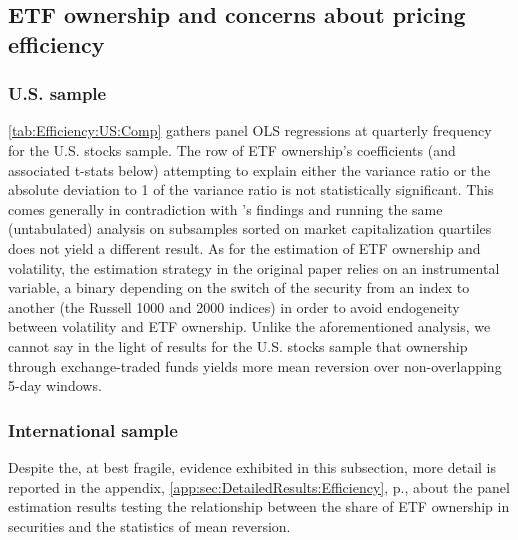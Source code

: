 \subsection{ETF ownership and concerns about pricing efficiency}
\label{sec:Results:sub:Efficiency}
\subsubsection{U.S. sample}
\autoref{tab:Efficiency:US:Comp} gathers panel OLS regressions at quarterly frequency for the U.S. stocks sample. The row of ETF ownership's coefficients (and associated t-stats below) attempting to explain either the variance ratio or the absolute deviation to 1 of the variance ratio is not statistically significant. This comes generally in contradiction with \textcite{Ben-David2018}'s findings and running the same (untabulated) analysis on subsamples sorted on market capitalization quartiles does not yield a different result. As for the estimation of ETF ownership and volatility, the estimation strategy in the original paper relies on an instrumental variable, a binary depending on the switch of the security from an index to another (the Russell 1000 and 2000 indices) in order to avoid endogeneity between volatility and ETF ownership. Unlike the aforementioned analysis, we cannot say in the light of results for the U.S. stocks sample that ownership through exchange-traded funds yields more mean reversion over non-overlapping 5-day windows. 

\begin{landscape}
  {\linespread{1.0}
    \begin{table}[htbp]
      
    \end{table}
  }
\end{landscape}

\subsubsection{International sample}

Despite the, at best fragile, evidence exhibited in this subsection, more detail is reported in the appendix, \autoref{app:sec:DetailedResults:Efficiency}, p.\pageref{app:sec:DetailedResults:Efficiency}, about the panel estimation results testing the relationship between the share of ETF ownership in securities and the statistics of mean reversion.


